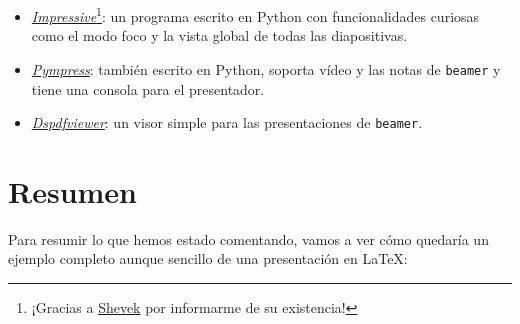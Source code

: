 \begin{itemize}
\item
  \href{http://impressive.sourceforge.net/}{\emph{Impressive}}\footnote{¡Gracias
    a \href{https://quitter.se/notice/9129937}{Shevek} por informarme de
    su existencia!}: un programa escrito en Python con funcionalidades
  curiosas como el modo foco y la vista global de todas las
  diapositivas.
\item
  \href{https://github.com/Cimbali/pympress}{\emph{Pympress}}: también
  escrito en Python, soporta vídeo y las notas de \lstinline!beamer! y
  tiene una consola para el presentador.
\item
  \href{https://github.com/dannyedel/dspdfviewer}{\emph{Dspdfviewer}}:
  un visor simple para las presentaciones de \lstinline!beamer!.
\end{itemize}

\section{Resumen}

Para resumir lo que hemos estado comentando, vamos a ver cómo quedaría
un ejemplo completo aunque sencillo de una presentación en LaTeX:

